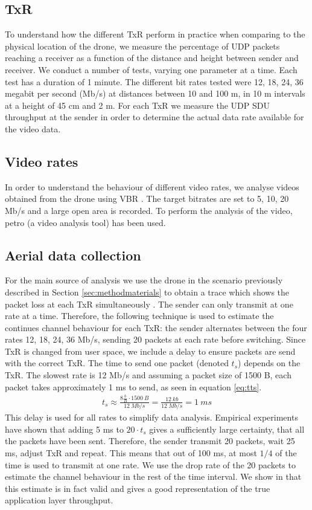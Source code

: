 \subsection{TxR}
To understand how the different TxR perform in practice when comparing to the physical location of the drone, we measure the percentage of UDP packets reaching a receiver as a function of the distance and height between sender and receiver.
We conduct a number of tests, varying one parameter at a time. Each test has a duration of 1 minute.
The different bit rates tested were 12, 18, 24, 36 megabit per second (Mb/s) at distances between 10 and 100 m, in 10 m intervals at a height of 45 cm and 2 m. For each TxR we measure the UDP SDU throughput at the sender in order to determine the actual data rate available for the video data.
\subsection{Video rates}
In order to understand the behaviour of different video rates, we analyse videos obtained from the drone using VBR \cite{WorksheetH264}. The target bitrates are set to 5, 10, 20 Mb/s and a large open area is recorded. To perform the analysis of the video, petro\cite{petro} (a video analysis tool) has been used.
\subsection{Aerial data collection}\label{subsec:ArealData}
For the main source of analysis we use the drone in the scenario previously described in Section \ref{sec:methodmaterials} to obtain a trace which shows the packet loss at each TxR simultaneously \cite{droneVid}. The sender can only transmit at one rate at a time. Therefore, the following technique is used to estimate the continues channel behaviour for each TxR: the sender alternates between the four rates 12, 18, 24, 36 Mb/s, sending 20 packets at each rate before switching. Since TxR is changed from user space, we include a delay to ensure packets are send with the correct TxR.
The time to send one packet (denoted $ t_{s} $) depends on the TxR. The slowest rate is 12 Mb/s and assuming a packet size of 1500 B, each packet takes approximately 1 ms to send, as seen in equation \ref{eq:tts}.
\begin{equation}
	\begin{split}
		t_{s} \approx  \frac{8 \frac{b}{B} \cdot 1500 \ B}{12 \ Mb/s}  =  \frac{12 \ kb}{12 \ Mb/s} = 1 \ ms
	\end{split}
	\label{eq:tts}
\end{equation}
This delay is used for all rates to simplify data analysis. Empirical experiments have shown that adding 5 ms to $ 20 \cdot t_{s} $ gives a sufficiently large certainty, that all the packets have been sent.
Therefore, the sender transmit 20 packets, wait 25 ms, adjust TxR and repeat. This means that out of 100 ms, at most $1/4$ of the time is used to transmit at one rate. We use the drop rate of the 20 packets to estimate the channel behaviour in the rest of the time interval.
We show in \cite{WorksheetValidEstimate} that this estimate is in fact valid and gives a good representation of the true application layer throughput.


